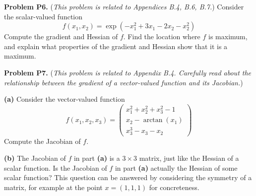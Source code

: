 \documentclass[12pt]{amsart}
\newcommand{\prob}[1]{\bigskip\noindent\textbf{#1}\quad }
\newcommand{\epart}[1]{\medskip\noindent\textbf{(#1)}\quad }
\begin{document}
\prob{Problem P6.}  (\emph{This problem is related to Appendices B.4, B.6, B.7.})  Consider the scalar-valued function
    $$f(x_1,x_2) = \exp(-x_1^2 + 3 x_1 - 2 x_2 - x_2^2)$$
Compute the gradient and Hessian of $f$.  Find the location where $f$ is maximum, and explain what properties of the gradient and Hessian show that it is a maximum.

\clearpage \newpage
\prob{Problem P7.}  (\emph{This problem is related to Appendix B.4.  Carefully read about the relationship between the gradient of a vector-valued function and its Jacobian.})

\epart{a}  Consider the vector-valued function
    $$f(x_1,x_2,x_3) = \begin{pmatrix}  x_1^2 + x_2^2 + x_3^2 - 1 \\
                                        x_2 - \arctan(x_1) \\
                                        x_3^3 - x_3 - x_2 \end{pmatrix}$$
Compute the Jacobian of $f$.

\epart{b}  The Jacobian of $f$ in part \textbf{(a)} is a $3 \times 3$ matrix, just like the Hessian of a scalar function.  Is the Jacobian of $f$ in part \textbf{(a)} actually the Hessian of some scalar function?  This question can be answered by considering the symmetry of a matrix, for example at the point $x=(1,1,1)$ for concreteness.
\end{document}
